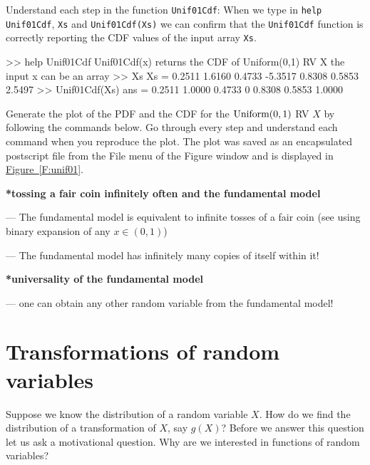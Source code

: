 {\begin{labwork}\label{LW:Unif01Cdf}
Understand each step in the function {\tt Unif01Cdf}:
When we type in {\tt help Unif01Cdf}, {\tt Xs} and {\tt Unif01Cdf(Xs)} we can confirm that the {\tt Unif01Cdf} function is correctly reporting the CDF values of the input array {\tt Xs}.
\begin{VrbM}
>> help Unif01Cdf
  Unif01Cdf(x) returns the CDF of Uniform(0,1) RV X
  the input x can be an array 
>> Xs
Xs =    0.2511    1.6160    0.4733   -5.3517    0.8308    0.5853    2.5497
>> Unif01Cdf(Xs)
ans =    0.2511    1.0000    0.4733         0    0.8308    0.5853    1.0000
\end{VrbM}
\end{labwork}

\begin{labwork}\label{LW:PlotUnif01PdfCdf}
Generate the plot of the PDF and the CDF for the $\mbox{{\rm Uniform}}(0,1)$ RV $X$ by following the commands below.  Go through every step and understand each command when you reproduce the plot.
The plot was saved as an encapsulated postscript file from the File menu of the Figure window and is displayed in \hyperref[F:unif01]{Figure~\ref*{F:unif01}}.
 \end{labwork}
}

{\bf **tossing a fair coin infinitely often and the fundamental model}


--- The fundamental model is equivalent to infinite tosses of a fair coin (see using binary expansion of any $x \in (0,1)$)

--- The fundamental model has infinitely many copies of itself within it!


{\bf **universality of the fundamental model}

--- one can obtain any other random variable from the fundamental model!


\section{Transformations of random variables}\label{S:TransformationsOFRvs}

Suppose we know the distribution of a random variable $X$.  How do we find the distribution of a transformation of $X$, say $g(X)$?
Before we answer this question let us ask a motivational question.  Why are we interested in functions of random variables?

